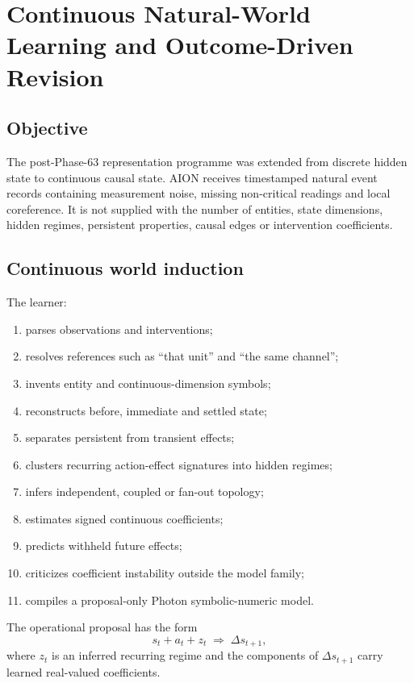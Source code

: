 \section{Continuous Natural-World Learning and Outcome-Driven Revision}
\label{sec:continuous-world-revision}

\subsection{Objective}

The post-Phase-63 representation programme was extended from discrete hidden
state to continuous causal state.  AION receives timestamped natural event
records containing measurement noise, missing non-critical readings and local
coreference.  It is not supplied with the number of entities, state dimensions,
hidden regimes, persistent properties, causal edges or intervention
coefficients.

\subsection{Continuous world induction}

The learner:
\begin{enumerate}
  \item parses observations and interventions;
  \item resolves references such as ``that unit'' and ``the same channel'';
  \item invents entity and continuous-dimension symbols;
  \item reconstructs before, immediate and settled state;
  \item separates persistent from transient effects;
  \item clusters recurring action-effect signatures into hidden regimes;
  \item infers independent, coupled or fan-out topology;
  \item estimates signed continuous coefficients;
  \item predicts withheld future effects;
  \item criticizes coefficient instability outside the model family;
  \item compiles a proposal-only Photon symbolic-numeric model.
\end{enumerate}

The operational proposal has the form
\[
  s_t + a_t + z_t
  \;\Rightarrow\;
  \Delta s_{t+1},
\]
where $z_t$ is an inferred recurring regime and the components of
$\Delta s_{t+1}$ carry learned real-valued coefficients.

